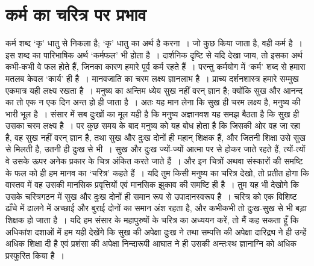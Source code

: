 
\chapter{कर्म का चरित्र पर प्रभाव}

\vskip 2pt

\noindent कर्म शब्द ‘कृ’ धातु से निकला है; ‘कृ’ धातु का अर्थ है करना~। जो कुछ किया जाता है, वही कर्म है~। इस शब्द का पारिभाषिक अर्थ ‘कर्मफल’ भी होता है~। दार्शनिक दृष्टि से यदि देखा जाय, तो इसका अर्थ कभी-कभी वे फल होते हैं, जिनका कारण हमारे पूर्व कर्म रहते हैं~। परन्तु कर्मयोग में ‘कर्म’ शब्द से हमारा मतलब केवल ‘कार्य’ ही है~। मानवजाति का चरम लक्ष्य ज्ञानलाभ है~। प्राच्य दर्शनशास्त्र हमारे सम्मुख एकमात्र यही लक्ष्य रखता है~। मनुष्य का अन्तिम ध्येय सुख नहीं वरन् ज्ञान है; क्योंकि सुख और आनन्द का तो एक न एक दिन अन्त हो ही जाता है~। अतः यह मान लेना कि सुख ही चरम लक्ष्य है, मनुष्य की भारी भूल है~। संसार में सब दुःखों का मूल यही है कि मनुष्य अज्ञानवश यह समझ बैठता है कि सुख ही उसका चरम लक्ष्य है~। पर कुछ समय के बाद मनुष्य को यह बोध होता है कि जिसकी ओर वह जा रहा है, वह सुख नहीं वरन् ज्ञान है, तथा सुख और दुःख दोनों ही महान् शिक्षक हैं, और जितनी शिक्षा उसे सुख से मिलती है, उतनी ही दुःख से भी~। सुख और दुःख ज्यों-ज्यों आत्मा पर से होकर जाते रहते हैं, त्यों-त्यों वे उसके ऊपर अनेक प्रकार के चित्र अंकित करते जाते हैं~। और इन चित्रों अथवा संस्कारों की समष्टि के फल को ही हम मानव का ‘चरित्र’ कहते हैं~। यदि तुम किसी मनुष्य का चरित्र देखो, तो प्रतीत होगा कि वास्तव में वह उसकी मानसिक प्रवृत्तियों एवं मानसिक झुकाव की समष्टि ही है~। तुम यह भी देखोगे कि उसके चरित्रगठन में सुख और दुःख दोनों ही समान रूप से उपादानस्वरूप है~। चरित्र को एक विशिष्ट ढाँचे में ढालने में अच्छाई और बुराई दोनों का समान अंश रहता है, और कभीकभी तो दुःख-सुख से भी बड़ा शिक्षक हो जाता है~। यदि हम संसार के महापुरुषों के चरित्र का अध्ययन करें, तो मैं कह सकता हूँ कि अधिकांश दशाओं में हम यही देखेंगे कि सुख की अपेक्षा दुःख ने तथा सम्पत्ति की अपेक्षा दारिद्र्य ने ही उन्हें अधिक शिक्षा दी है एवं प्रशंसा की अपेक्षा निन्दारूपी आघात ने ही उसकी अन्तःस्थ ज्ञानाग्नि को अधिक प्रस्फुरित किया है~।

